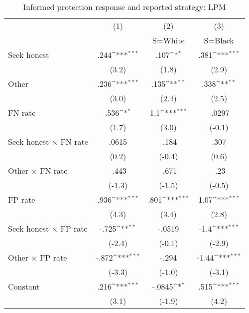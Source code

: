 \begin{table}[htbp]\centering
\def\sym#1{\ifmmode^{#1}\else\(^{#1}\)\fi}
\caption{Informed protection response and reported strategy: LPM}
\begin{tabular}{l*{3}{c}}
\hline\hline
                &\multicolumn{1}{c}{(1)}&\multicolumn{1}{c}{(2)}&\multicolumn{1}{c}{(3)}\\
                &\multicolumn{1}{c}{}&\multicolumn{1}{c}{S=White}&\multicolumn{1}{c}{S=Black}\\
\hline
Seek honest     &     .244\sym{***}&     .107\sym{*}  &     .381\sym{***}\\
                &    (3.2)         &    (1.8)         &    (2.9)         \\
Other           &     .236\sym{***}&     .135\sym{**} &     .338\sym{**} \\
                &    (3.0)         &    (2.4)         &    (2.5)         \\
FN rate         &     .536\sym{*}  &      1.1\sym{***}&   -.0297         \\
                &    (1.7)         &    (3.0)         &   (-0.1)         \\
Seek honest $\times$ FN rate&    .0615         &    -.184         &     .307         \\
                &    (0.2)         &   (-0.4)         &    (0.6)         \\
Other $\times$ FN rate&    -.443         &    -.671         &     -.23         \\
                &   (-1.3)         &   (-1.5)         &   (-0.5)         \\
FP rate         &     .936\sym{***}&     .801\sym{***}&     1.07\sym{***}\\
                &    (4.3)         &    (3.4)         &    (2.8)         \\
Seek honest $\times$ FP rate&    -.725\sym{**} &   -.0519         &     -1.4\sym{***}\\
                &   (-2.4)         &   (-0.1)         &   (-2.9)         \\
Other $\times$ FP rate&    -.872\sym{***}&    -.294         &    -1.44\sym{***}\\
                &   (-3.3)         &   (-1.0)         &   (-3.1)         \\
Constant        &     .216\sym{***}&   -.0845\sym{*}  &     .515\sym{***}\\
                &    (3.1)         &   (-1.9)         &    (4.2)         \\

\end{tabular}
\end{table}

